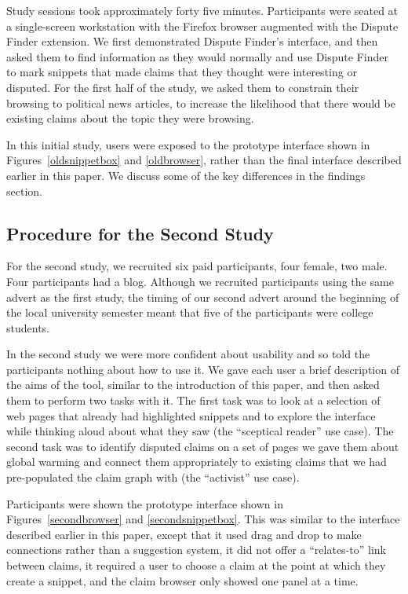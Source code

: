 \documentclass{www2010-submission}
\newcommand{\todo}[1]{}
\begin{document}
\todo{This was a bad recruiting strategy. We should have recruited people that fitted one of our two personas and then set them tasks that fitted our vision for that persona.}

Study sessions took approximately forty five minutes. Participants were seated at a single-screen workstation with the Firefox browser augmented with the Dispute Finder extension. We first demonstrated Dispute Finder's interface, and then asked them to find information as they would normally and use Dispute Finder to mark snippets that made claims that they thought were interesting or disputed. For the first half of the study, we asked them to constrain their browsing to political news articles, to increase the likelihood that there would be existing claims about the topic they were browsing.

In this initial study, users were exposed to the prototype interface shown in Figures~\ref{oldsnippetbox} and \ref{oldbrowser}, rather than the final interface described earlier in this paper. We discuss some of the key differences in the findings section.

\subsection{Procedure for the Second Study}

For the second study, we recruited six paid participants, four female, two male. Four participants had a blog. Although we recruited participants using the same advert as the first study, the timing of our second advert around the beginning of the local university semester meant that five of the participants were college students. 

In the second study we were more confident about usability and so told the participants nothing about how to use it. We gave each user a brief description of the aims of the tool, similar to the introduction of this paper, and then asked them to perform two tasks with it. The first task was to look at a selection of web pages that already had highlighted snippets and to explore the interface while thinking aloud about what they saw (the ``sceptical reader'' use case). The second task was to identify disputed claims on a set of pages we gave them about global warming and connect them appropriately to existing claims that we had pre-populated the claim graph with (the ``activist'' use case). 

Participants were shown the prototype interface shown in Figures~\ref{secondbrowser} and \ref{secondsnippetbox}. This was similar to the interface described earlier in this paper, except that it used drag and drop to make connections rather than a suggestion system, it did not offer a ``relates-to'' link between claims, it required a user to choose a claim at the point at which they create a snippet, and the claim browser only showed one panel at a time. 
\end{document}
